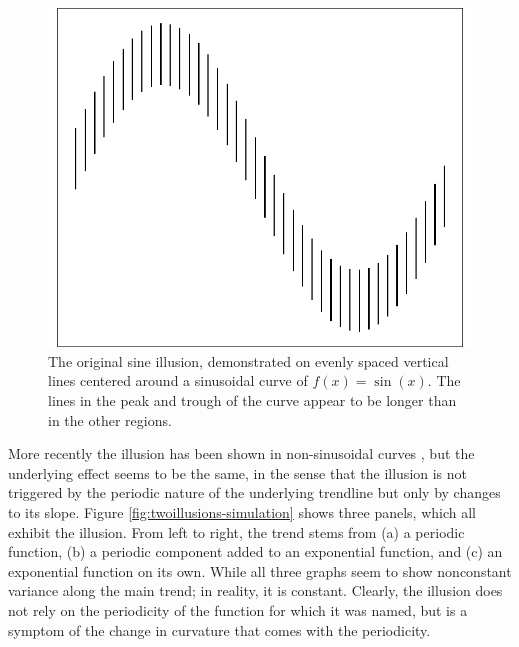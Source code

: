 \documentclass[11pt]{isuthesis}\usepackage[]{graphicx}\usepackage[]{color}
\newenvironment{knitrout}{}{} %
\begin{document}
\begin{figure}[hbtp]
\centering
\begin{knitrout}
\color{fgcolor}

{\centering \includegraphics[width=.4\linewidth]{Figure/sineIllusion/fig-original-1} 

}



\end{knitrout}
\caption[The original sine illusion]{The original sine illusion, demonstrated on evenly spaced vertical lines centered around a sinusoidal curve of $f(x) = \sin(x)$. The lines in the peak and trough of the curve appear to be longer than in the other regions.\label{fig:original}}
\end{figure}

More recently the illusion has been shown in non-sinusoidal curves \citep{cleveland:1984, schonlau:2003, robbins:2005, parallelsets}, but the underlying effect seems to be the same, in the sense that the illusion is not triggered by the periodic nature of the underlying trendline but only by  changes to its slope. Figure \ref{fig:twoillusions-simulation} shows three panels, which all exhibit the illusion. From left to right, the trend stems from (a) a periodic function, (b) a periodic component added to an exponential function, and (c) an exponential function on its own.
While all three graphs seem to show nonconstant variance along the main trend; in reality, it is constant. Clearly, the illusion does not rely on the periodicity of the function for which it was named, but is a symptom of the change in curvature that comes with the periodicity.
\end{document}
